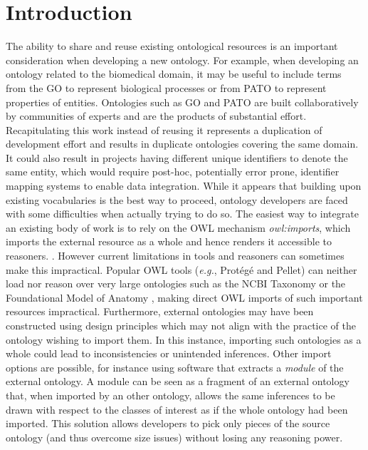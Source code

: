 \documentclass{ao2e}%
\begin{document}
\section{Introduction}

The ability to share and reuse existing ontological resources is an important consideration when developing a new ontology.
For example, when developing an ontology related to the biomedical domain, it may be useful to include terms from the \ac{GO}\cite{GO} to represent biological processes or from \ac{PATO}\cite{PATO} to represent properties of entities.
Ontologies such as GO and PATO are built collaboratively by communities of experts and are the products of substantial effort.
Recapitulating this work instead of reusing it represents a duplication of development effort and results in duplicate ontologies covering the same domain. It could also result in projects having different unique identifiers to denote the same entity, which would require post-hoc, potentially error prone, identifier mapping systems to enable data integration. 
While it appears that building upon existing vocabularies is the best way to proceed, ontology developers are faced with some difficulties when actually trying to do so.
The easiest way to integrate an existing body of work is to rely on the \ac{OWL} \cite{OWL} mechanism \emph{owl:imports}, which imports the external resource as a whole and hence renders it accessible to reasoners. . However current limitations in tools and reasoners can sometimes make this impractical.
Popular OWL tools (\emph{e.g.}, Prot\'eg\'e\cite{Protege} and Pellet\cite{Sirin}) can neither load nor reason over very large ontologies such as the NCBI Taxonomy \cite{NCBI} or the Foundational Model of Anatomy \cite{FMA}, making direct \ac{OWL} imports of such important resources impractical. 
Furthermore, external ontologies may have been constructed using design principles which may not align with the practice of the ontology wishing to import them.  In this instance, importing such ontologies as a whole could lead to inconsistencies or unintended inferences. %
Other import options are possible, for instance using software that extracts a \emph{module} \cite{Grau} of the external ontology.
A module can be seen as a fragment of an external ontology that, when imported by an other ontology, allows the same inferences to be drawn with respect to the classes of interest as if the whole ontology had been imported. This solution allows developers to pick only pieces of the source ontology (and thus overcome size issues) without losing any reasoning power.
\end{document}
